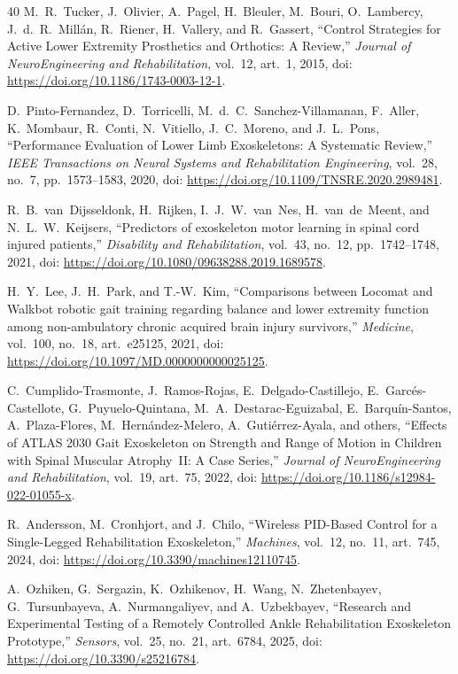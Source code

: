 \documentclass[journal]{IEEEtran}
\begin{document}
\begin{thebibliography}{40}
M.~R.~Tucker, J.~Olivier, A.~Pagel, H.~Bleuler, M.~Bouri, O.~Lambercy, J.~d.~R.~Millán, R.~Riener, H.~Vallery, and R.~Gassert, ``Control Strategies for Active Lower Extremity Prosthetics and Orthotics: A Review,'' \emph{Journal of NeuroEngineering and Rehabilitation}, vol.~12, art.~1, 2015, doi: \url{https://doi.org/10.1186/1743-0003-12-1}.

D.~Pinto-Fernandez, D.~Torricelli, M.~d.~C.~Sanchez-Villamanan, F.~Aller, K.~Mombaur, R.~Conti, N.~Vitiello, J.~C.~Moreno, and J.~L.~Pons, ``Performance Evaluation of Lower Limb Exoskeletons: A Systematic Review,'' \emph{IEEE Transactions on Neural Systems and Rehabilitation Engineering}, vol.~28, no.~7, pp.~1573--1583, 2020, doi: \url{https://doi.org/10.1109/TNSRE.2020.2989481}.


R.~B.~van~Dijsseldonk, H.~Rijken, I.~J.~W.~van~Nes, H.~van~de~Meent, and N.~L.~W.~Keijsers, ``Predictors of exoskeleton motor learning in spinal cord injured patients,'' \emph{Disability and Rehabilitation}, vol.~43, no.~12, pp.~1742--1748, 2021, doi: \url{https://doi.org/10.1080/09638288.2019.1689578}.

H.~Y.~Lee, J.~H.~Park, and T.-W.~Kim, ``Comparisons between Locomat and Walkbot robotic gait training regarding balance and lower extremity function among non-ambulatory chronic acquired brain injury survivors,'' \emph{Medicine}, vol.~100, no.~18, art.~e25125, 2021, doi: \url{https://doi.org/10.1097/MD.0000000000025125}.

C.~Cumplido-Trasmonte, J.~Ramos-Rojas, E.~Delgado-Castillejo, E.~Garcés-Castellote, G.~Puyuelo-Quintana, M.~A.~Destarac-Eguizabal, E.~Barquín-Santos, A.~Plaza-Flores, M.~Hernández-Melero, A.~Gutiérrez-Ayala, and others, ``Effects of ATLAS 2030 Gait Exoskeleton on Strength and Range of Motion in Children with Spinal Muscular Atrophy~II: A Case Series,'' \emph{Journal of NeuroEngineering and Rehabilitation}, vol.~19, art.~75, 2022, doi: \url{https://doi.org/10.1186/s12984-022-01055-x}.


R.~Andersson, M.~Cronhjort, and J.~Chilo, ``Wireless PID-Based Control for a Single-Legged Rehabilitation Exoskeleton,'' \emph{Machines}, vol.~12, no.~11, art.~745, 2024, doi: \url{https://doi.org/10.3390/machines12110745}.


A.~Ozhiken, G.~Sergazin, K.~Ozhikenov, H.~Wang, N.~Zhetenbayev, G.~Tursunbayeva, A.~Nurmangaliyev, and A.~Uzbekbayev, ``Research and Experimental Testing of a Remotely Controlled Ankle Rehabilitation Exoskeleton Prototype,'' \emph{Sensors}, vol.~25, no.~21, art.~6784, 2025, doi: \url{https://doi.org/10.3390/s25216784}.



\end{thebibliography}
\end{document}

